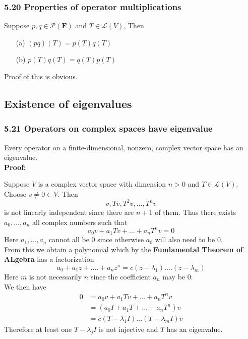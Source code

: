 \documentclass{article}
\begin{document}
\subsubsection*{5.20 Properties of operator multiplications}
Suppose $p, q \in \mathcal{P}(\mathbf{F})$ and $T \in \mathcal{L}(V)$, Then
\begin{itemize}
    \item[(a)] $(pq)(T) = p(T)q(T)$
    \item[(b)] $p(T)q(T) = q(T)p(T)$
\end{itemize}
Proof of this is obvious.
\subsection*{Existence of eigenvalues}
\subsubsection*{5.21 Operators on complex spaces have eigenvalue}
Every operator on a finite-dimensional, nonzero, complex vector space has an eigenvalue.\\
\textbf{Proof:}
\begin{addmargin}[1em]{0em}
    Suppose $V$ is a complex vector space with dimension $n > 0$ and $T \in \mathcal{L}(V)$. Choose $v \neq 0 \in V$. Then
    \begin{equation*}
        v, Tv, T^2v, ..., T^nv
    \end{equation*}
    is not linearly independent since there are $n+1$ of them. Thus there exists $a_0, ..., a_n$ all complex numbers such that
    \begin{equation*}
        a_0v + a_1Tv + ... + a_nT^nv = 0
    \end{equation*}
    Here $a_1, ..., a_n$ cannot all be $0$ since otherwise $a_0$ will also need to be $0$.\\
    From this we obtain a polynomial which by the \textbf{Fundamental Theorem of ALgebra} has a factorization
    \begin{equation*}
        a_0 + a_1z + .... + a_nz^n = c(z - \lambda_1)....(z - \lambda_m)
    \end{equation*}
    Here $m$ is not necessarily $n$ since the coefficient $a_n$ may be $0$.\\
    We then have
    \begin{equation*}
        \begin{split}
            0 &= a_0v + a_1Tv + ... + a_nT^nv\\
            &= (a_0I + a_1T + ... + a_nT^n)v\\
            &= c(T - \lambda_1I) ... (T - \lambda_mI)v
        \end{split}
    \end{equation*}
    Therefore at least one $T-\lambda_jI$ is not injective and $T$ has an eigenvalue.
\end{addmargin}
\end{document}
